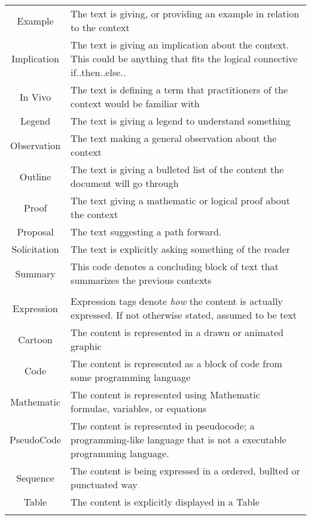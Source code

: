 \begin{table}[h!]
\begin{tabular}{c p{1.8\linewidth}}
    Example & The text is giving, or providing an example in relation to the context\\
    Implication & The text is giving an implication about the context. This could be anything that fits the logical connective if..then..else..\\
    In Vivo & The text is defining a term that practitioners of the context would be familiar with\\
    Legend & The text is giving a legend to understand something\\
    Observation & The text making a general observation about the context\\
    Outline & The text is giving a bulleted list of the content the document will go through\\
    Proof & The text giving a mathematic or logical proof about the context\\
    Proposal & The text suggesting a path forward.\\
    Solicitation & The text is explicitly asking something of the reader\\
    Summary & This code denotes a concluding block of text that summarizes the previous contexts\\

\\
    Expression & Expression tags denote \emph{how }the content is actually expressed. If not otherwise stated, assumed to be text \\
    \hline
    Cartoon & The content is represented in a drawn or animated graphic\\
    Code & The content is represented as a block of code from some programming language\\
    Mathematic & The content is represented using Mathematic formulae, variables, or equations\\
    PseudoCode & The content is represented in pseudocode; a programming-like language that is not a executable programming language.\\
    Sequence & The content is being expressed in a ordered, bullted or punctuated way\\
    Table & The content is explicitly displayed in a Table\\
    \\


\end{tabular}
\end{table}
